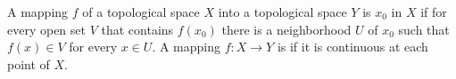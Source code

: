 A mapping $f$ of a topological space $X$ into a topological space $Y$ is  $x_0$ in $X$ if for every open set $V$ that contains $f(x_0)$ there is a neighborhood $U$ of $x_0$ such that $f(x) \in V$ for every $x \in U$. A mapping $f: X \to Y$ is  if it is continuous at each point of $X$.
